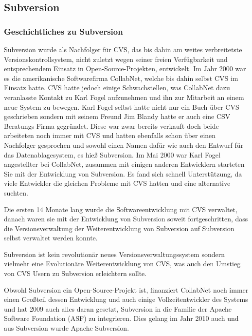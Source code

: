 \subsection{Subversion}

\subsubsection{Geschichtliches zu Subversion}

Subversion wurde als Nachfolger für CVS, das bis dahin am weites verbreitetste Versionskontrollsystem, nicht zuletzt wegen seiner freien Verfügbarkeit und entsprechendem Einsatz in Open-Source-Projekten, entwickelt.
Im Jahr 2000 war es die amerikanische Softwarefirma CollabNet, welche bis dahin selbst CVS im Einsatz hatte. CVS hatte jedoch einige Schwachstellen, was CollabNet dazu veranlasste Kontakt zu Karl Fogel aufzunehmen und ihn zur Mitarbeit an einem neue System zu bewegen. Karl Fogel selbst hatte nicht nur ein Buch\autocite{OPSmCVS} über CVS geschrieben sondern mit seinem Freund Jim Blandy hatte er auch eine CSV Beratungs Firma gegründet. Diese war zwar bereits verkauft doch beide arbeiteten noch immer mit CVS und hatten ebenfalls schon über einen Nachfolger gesprochen und sowohl einen Namen dafür wie auch den Entwurf für das Datenablagesystem, es hieß Subversion. Im Mai 2000 war Karl Fogel angestellter bei CollabNet, zusammen mit einigen anderen Entwicklern starteten Sie mit der Entwicklung von Subversion. Es fand sich schnell Unterstützung, da viele Entwickler die gleichen Probleme mit 
CVS hatten und eine alternative suchten.

Die ersten 14 Monate lang wurde die Softwareentwicklung mit CVS verwaltet, danach waren sie mit der Entwicklung von Subversion soweit fortgeschritten, dass die Versionsverwaltung der Weiterentwicklung von Subversion auf Subversion selbst verwaltet werden konnte. 

Subversion ist kein revolutionär neues Versionsverwaltungssystem sondern vielmehr eine Evolutionäre Weiterentwicklung von CVS, was auch den Umstieg von CVS Usern zu Subversion erleichtern sollte.

Obwohl Subversion ein Open-Source-Projekt ist, finanziert CollabNet noch immer einen Großteil dessen Entwicklung und auch einige Vollzeitentwickler des Systems und hat 2009 auch alles daran gesetzt, Subversion in die Familie der Apache Software Foundation (ASF) zu integrieren. Dies gelang im Jahr 2010 auch und aus Subversion wurde Apache Subversion.

